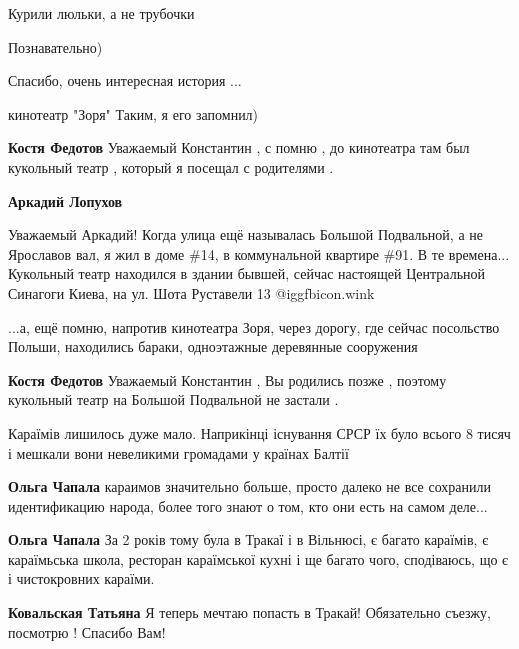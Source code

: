\begin{itemize}
\begin{itemize}
\end{itemize} %

Курили люльки, а не трубочки

Познавательно)

Спасибо, очень интересная история ...

кинотеатр "Зоря"
Таким, я его запомнил)

\begin{itemize} %
\textbf{Костя Федотов} Уважаемый Константин , с помню , до кинотеатра там был кукольный театр , который я посещал с родителями .

\begin{itemize} %
\textbf{Аркадий Лопухов} 

Уважаемый Аркадий! Когда улица ещё называлась Большой Подвальной, а не
Ярославов вал, я жил в доме \#14, в коммунальной квартире \#91. В те времена...
Кукольный театр находился в здании бывшей, сейчас настоящей Центральной
Синагоги Киева, на ул. Шота Руставели 13  @igg{fbicon.wink} 


...а, ещё помню, напротив кинотеатра Зоря, через дорогу, где сейчас посольство
Польши, находились бараки, одноэтажные деревянные сооружения

\textbf{Костя Федотов} Уважаемый Константин , Вы родились позже , поэтому кукольный театр на Большой Подвальной не застали .
\end{itemize} %

\end{itemize} %


Караїмів лишилось дуже мало. Наприкінці існування СРСР їх було всього 8 тисяч і
мешкали вони невеликими громадами у країнах Балтії

\begin{itemize} %
\textbf{Ольга Чапала} караимов значительно больше, просто далеко не все сохранили идентификацию народа, более того знают о том, кто они есть на самом деле...

\textbf{Ольга Чапала} За 2 років тому була в Тракаї і в Вільнюсі, є багато караїмів, є караїмьська школа, ресторан караїмської кухні і ще багато чого, сподіваюсь, що є і чистокровних караїми.

\textbf{Ковальская Татьяна} Я теперь мечтаю попасть в Тракай! Обязательно съезжу, посмотрю ! Спасибо Вам!


\end{itemize}
\end{itemize}
